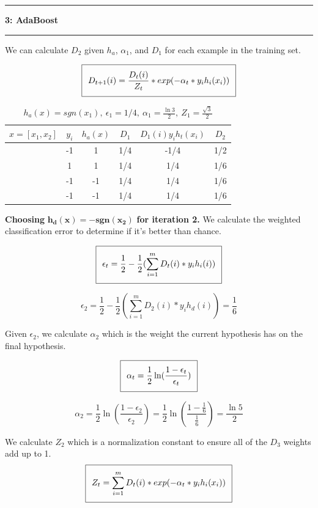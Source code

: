 \documentclass[11pt]{article}
\newcommand\question[2]{\vspace{.25in}\hrule\textbf{#1: #2}\vspace{.5em}\hrule\vspace{.10in}}
\begin{document}
\question{3}{AdaBoost}
We can calculate $D_2$ given $h_a$, $\alpha_1$, and $D_1$ for each example in the training set.

\begin{equation}
\setlength\fboxsep{0.25cm}
\setlength\fboxrule{0.4pt}
\boxed{D_{t+1}(i) = \frac{D_t(i)}{Z_t} * exp(-\alpha_t * y_ih_i(x_i))}
\end{equation}

 \begin{table}[H]
\centering
{\renewcommand{\arraystretch}{1.2}%
\begin{tabular}{| c | c | c | c | c | c |}
\hline
$x = [x_1, x_2]$& $y_i$ & $h_a(x)$ & $D_1$ & $D_1(i)y_ih_t(x_i)$ & $D_2$\\
\hline
[1,1] & -1 & 1 & 1/4 & -1/4 & 1/2\\ \hline
[1,-1] & 1 & 1 & 1/4 & 1/4 & 1/6\\ \hline
[-1,-1] & -1 & -1 & 1/4 & 1/4 & 1/6\\ \hline
[-1,1] & -1 & -1 & 1/4 & 1/4 & 1/6\\ \hline
\end{tabular}}
\caption{$h_a(x) = sgn(x_1), \ \epsilon_1 = 1/4, \ \alpha_1 = \frac{\ln3}{2}, \ Z_1 = \frac{\sqrt{3}}{2}$}
\end{table}

\textbf{Choosing} $\mathbf{h_d(x) = -sgn(x_2)}$ \textbf{for iteration 2.} We calculate the weighted classification error to determine if it's better than chance.

\begin{equation}
\setlength\fboxsep{0.25cm}
\setlength\fboxrule{0.4pt}
\boxed{\epsilon_t = \frac{1}{2} - \frac{1}{2}(\sum_{i=1}^m D_t(i)*y_ih_i(i))}
\end{equation}

$$\epsilon_2 = \frac{1}{2} - \frac{1}{2}(\sum_{i=1}^m D_2(i)*y_ih_d(i)) = \frac{1}{6}$$

Given $\epsilon_2$, we calculate $\alpha_2$ which is the weight the current hypothesis has on the final hypothesis.

\begin{equation}
\setlength\fboxsep{0.25cm}
\setlength\fboxrule{0.4pt}
\boxed{\alpha_t = \frac{1}{2}\ln(\frac{1 - \epsilon_t}{\epsilon_t})}
\end{equation}

$$\alpha_2 = \frac{1}{2}\ln(\frac{1 - \epsilon_2}{\epsilon_2}) = \frac{1}{2}\ln(\frac{1 - \frac{1}{6}}{\frac{1}{6}}) = \frac{\ln5}{2}$$

We calculate $Z_2$ which is a normalization constant to ensure all of the $D_3$ weights add up to 1.
\begin{equation}
\setlength\fboxsep{0.25cm}
\setlength\fboxrule{0.4pt}
\boxed{Z_t = \sum_{i = 1}^m D_t(i) * exp(-\alpha_t * y_ih_i(x_i))}
\end{equation}
\end{document}
